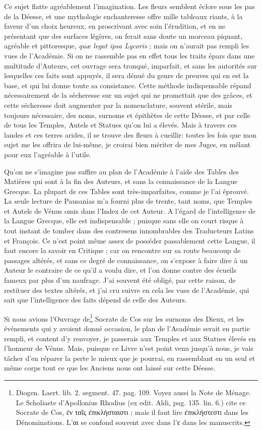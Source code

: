 \documentclass[a4paper, 18pt, oneside]{article}
\begin{document}
Ce sujet flatte agréablement l'imagination. Les fleurs semblent éclore sous les pas de la Déesse, et une mythologie enchanteresse offre mille tableaux riants, à la faveur d'un choix heureux, en proscrivant avec soin l'érudition, et en ne présentant que des surfaces légères, on ferait sans doute un morceau piquant, agréable et pittoresque, \emph{quæ legat ipsa Lycoris} ; mais on n'aurait pas rempli les vues de l'Académie. Si on ne rassemble pas en effet tous les traits épars dans une multitude d'Auteurs, cet ouvrage sera tronqué, imparfait, et sans les autorités sur lesquelles ces faits sont appuyés, il sera dénué du genre de preuves qui en est la base, et qui lui donne toute sa consistance. Cette méthode indispensable répand nécessairement de la sécheresse sur un sujet qui ne promettait que des grâces, et cette sécheresse doit augmenter par la nomenclature, souvent stérile, mais toujours nécessaire, des noms, surnoms et épithètes de cette Déesse, et par celle de tous les Temples, Autels et Statues qu'on lui a élevés. Mais à travers ces landes et ces terres arides, il se trouve des fleurs à cueillir: toutes les fois que mon sujet me les offrira de lui-même, je croirai bien mériter de mes Juges, en mêlant pour eux l'agréable à l'utile.

Qu'on ne s'imagine pas suffire au plan de l'Académie à l'aide des Tables des Matières qui sont à la fin des Auteurs, et sans la connaissance de la Langue Grecque. La plupart de ces Tables sont très-imparfaites, comme je l'ai éprouvé. La seule lecture de Pausanias m'a fourni plus de trente, tant noms, que Temples et Autels de Vénus omis dans l'Index de cet Auteur. A l'égard de l'intelligence de la Langue Grecque, elle est indispensable ; puisque sans elle on court risque à tout instant de tomber dans des contresens innombrables des Traducteurs Latins et François. Ce n'est point même assez de posséder passablement cette Langue, il faut encore la savoir en Critique ; car on rencontre sur sa route beaucoup de passages altérés, et sans ce degré de connaissance, on s'expose à faire dire à un Auteur le contraire de ce qu'il a voulu dire, et l'on donne contre des écueils fameux par plus d'un naufrage. J'ai souvent été obligé, par cette raison, de restituer des textes altérés, et j'ai cru suivre en cela les vues de l'Académie, qui sait que l'intelligence des faits dépend de celle des Auteurs.

Si nous avions l'Ouvrage de\footnote{Diogen. Laert. lib. 2. segment. 47. pag. 109. Voyez aussi la Note de Ménage. Le Scholiaste d'Apollonius Rhodius (ex edit. Aldi, pag. 135. lin. 6.) cite ce Socrate de Cos, ἐν ταῖς ἐπικλήσταιστι ; mais il faut lire ἐπικλήστεστι dans les Dénominations. L'αι se confond souvent avec dans l'ε dans les manuscrits.} Socrate de Cos sur les surnoms des Dieux, et les événements qui y avoient donné occasion, le plan de l'Académie serait en partie rempli, et content d'y renvoyer, je passerais aux Temples et aux Statues élevés en l'honneur de Vénus. Mais, puisque ce Livre n'est point venu jusqu'à nous, je vais tâcher d'en réparer la perte le mieux que je pourrai, en rassemblant en un seul et même corps tout ce que les Anciens nous ont laissé sur cette Déesse.
\end{document}
